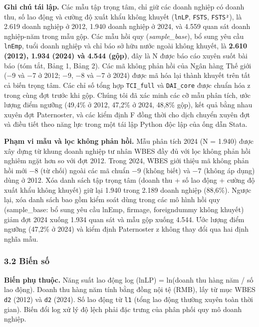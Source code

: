 \documentclass[12pt,a4paper]{article}
\begin{document}
\textbf{Ghi chú tái lập.} Các mẫu tập trọng tâm, chỉ giữ các doanh
nghiệp có doanh thu, số lao động và cường độ xuất khẩu không khuyết
(\texttt{lnLP}, \texttt{FSTS}, \texttt{FSTS²}), là 2.619 doanh nghiệp ở
2012, 1.940 doanh nghiệp ở 2024, và 4.559 quan sát doanh nghiệp-năm
trong mẫu gộp. Các mẫu hồi quy (\emph{sample\_base}), bổ sung yêu cầu
\texttt{lnEmp}, tuổi doanh nghiệp và chỉ báo sở hữu nước ngoài không
khuyết, là \textbf{2.610 (2012), 1.934 (2024) và 4.544 (gộp)}, đây là N
được báo cáo xuyên suốt bài báo (tóm tắt, Bảng 1, Bảng 2). Các mã không
phản hồi của Ngân hàng Thế giới (−9 và −7 ở 2012; −9, −8 và −7 ở 2024)
được mã hóa lại thành khuyết trên tất cả biến trọng tâm. Các chỉ số tổng
hợp \texttt{TCI\_full} và \texttt{DAI\_core} được chuẩn hóa z trong cùng
đợt trước khi gộp. Chúng tôi đã xác minh các cỡ mẫu phân tích, ước lượng
điểm ngưỡng (49,4\% ở 2012, 47,2\% ở 2024, 48,8\% gộp), kết quả bằng
nhau xuyên đợt Paternoster, và các kiểm định F đồng thời cho dịch chuyển
xuyên đợt và điều tiết theo năng lực trong một tái lập Python độc lập
của ống dẫn Stata.

\textbf{Phạm vi mẫu và lọc không phản hồi.} Mẫu phân tích 2024 (N =
1.940) được xây dựng từ khung doanh nghiệp tư nhân WBES đầy đủ với lọc
không phản hồi nghiêm ngặt hơn so với đợt 2012. Trong 2024, WBES giới
thiệu mã không phản hồi mới −8 (từ chối) ngoài các mã chuẩn −9 (không
biết) và −7 (không áp dụng) dùng ở 2012. Xóa danh sách tập trọng tâm
(doanh thu + số lao động + cường độ xuất khẩu không khuyết) giữ lại
1.940 trong 2.189 doanh nghiệp (88,6\%). Ngược lại, xóa danh sách bao
gồm kiểm soát dùng trong các mô hình hồi quy (sample\_base: bổ sung yêu
cầu lnEmp, firmage, foreigndummy không khuyết) giảm đợt 2024 xuống 1.934
quan sát và mẫu gộp xuống 4.544. Ước lượng điểm ngưỡng (47,2\% ở 2024)
và kiểm định Paternoster z không thay đổi qua hai định nghĩa mẫu.

\hypertarget{32-biux1ebfn-sux1ed1}{%
\subsubsection{3.2 Biến số}\label{32-biux1ebfn-sux1ed1}}

\textbf{Biến phụ thuộc.} Năng suất lao động log (lnLP) = ln(doanh thu
hàng năm / số lao động). Doanh thu hàng năm tính bằng đồng nội tệ (RMB),
lấy từ mục WBES \texttt{d2} (2012) và \texttt{d2} (2024). Số lao động từ
\texttt{l1} (tổng lao động thường xuyên toàn thời gian). Biến đổi log xử
lý độ lệch phải đặc trưng của phân phối quy mô doanh nghiệp.
\end{document}
